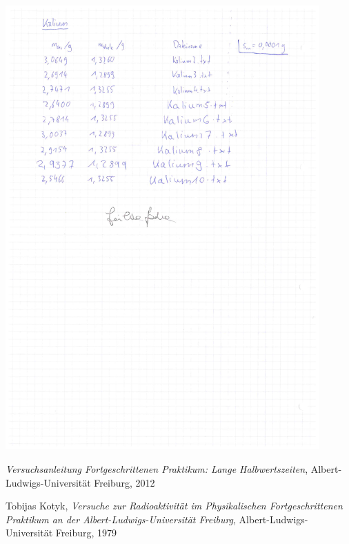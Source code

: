 \documentclass[12pt]{article}
\begin{document}
\begin{minipage}{\textwidth}
	\centering
	\includegraphics[width=0.9\textwidth]{figures/Laborbuch-2.pdf}
\end{minipage}
\newpage
\listoffigures


\newpage
\thispagestyle{empty}
\begin{thebibliography}{9}

\emph{Versuchsanleitung Fortgeschrittenen Praktikum: Lange Halbwertszeiten},
Albert-Ludwigs-Universität Freiburg,
2012

Tobijas Kotyk,
\emph{Versuche zur Radioaktivität im Physikalischen Fortgeschrittenen Praktikum an der Albert-Ludwigs-Universität Freiburg},
Albert-Ludwigs-Universität Freiburg,
1979
  
  

\end{thebibliography}
\end{document}
